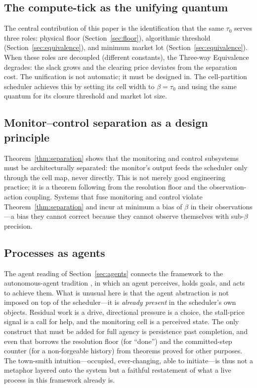 \documentclass[11pt,twocolumn,a4paper]{article}
\theoremstyle{plain}
\theoremstyle{definition}
\theoremstyle{remark}
\newcommand{\tick}{\tau_0}
\newcommand{\floor}{\beta}
\begin{document}
\subsection{The compute-tick as the unifying quantum}

The central contribution of this paper is the identification that the same $\tick$ serves three roles: physical floor (Section~\ref{sec:floor}), algorithmic threshold (Section~\ref{sec:equivalence}), and minimum market lot (Section~\ref{sec:equivalence}). When these roles are decoupled (different constants), the Three-way Equivalence degrades: the slack grows and the clearing price deviates from the separation cost. The unification is not automatic; it must be designed in. The cell-partition scheduler achieves this by setting its cell width to $\floor = \tick$ and using the same quantum for its closure threshold and market lot size.

\subsection{Monitor--control separation as a design principle}

Theorem~\ref{thm:separation} shows that the monitoring and control subsystems must be architecturally separated: the monitor's output feeds the scheduler only through the cell map, never directly. This is not merely good engineering practice; it is a theorem following from the resolution floor and the observation-action coupling. Systems that fuse monitoring and control violate Theorem~\ref{thm:separation} and incur at minimum a bias of $\floor$ in their observations---a bias they cannot correct because they cannot observe themselves with sub-$\floor$ precision.

\subsection{Processes as agents}

The agent reading of Section~\ref{sec:agents} connects the framework to the
autonomous-agent tradition \cite{russell2020}, in which an agent perceives, holds
goals, and acts to achieve them. What is unusual here is that the agent abstraction
is not imposed on top of the scheduler---it is \emph{already present} in the
scheduler's own objects. Residual work is a drive, directional pressure is a choice,
the stall-price signal is a call for help, and the monitoring cell is a perceived
state. The only construct that must be added for full agency is persistence past
completion, and even that borrows the resolution floor (for ``done'') and the
committed-step counter (for a non-forgeable history) from theorems proved for other
purposes. The town-smith intuition---occupied, ever-changing, able to initiate---is
thus not a metaphor layered onto the system but a faithful restatement of what a
live process in this framework already is.
\end{document}
